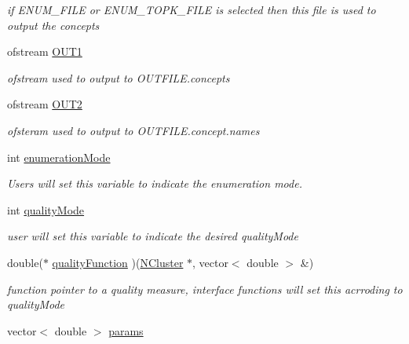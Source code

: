 \begin{DoxyCompactItemize}
\begin{DoxyCompactList}\small\item\em if ENUM\_\-FILE or ENUM\_\-TOPK\_\-FILE is selected then this file is used to output the concepts \item\end{DoxyCompactList}\item 
ofstream \hyperlink{class_lattice_algos_a5e06ea8a8e76d5b6019481e778655a5c}{OUT1}
\begin{DoxyCompactList}\small\item\em ofstream used to output to OUTFILE.concepts \item\end{DoxyCompactList}\item 
ofstream \hyperlink{class_lattice_algos_ad6ee83e69ef859717cbc747edf4fc306}{OUT2}
\begin{DoxyCompactList}\small\item\em ofsteram used to output to OUTFILE.concept.names \item\end{DoxyCompactList}\item 
int \hyperlink{class_lattice_algos_a03adc61166377c993b4d1ef8f8ee12ee}{enumerationMode}
\begin{DoxyCompactList}\small\item\em Users will set this variable to indicate the enumeration mode. \item\end{DoxyCompactList}\item 
int \hyperlink{class_lattice_algos_aabdafd3fa45b3ed1d773b313e3a60e17}{qualityMode}
\begin{DoxyCompactList}\small\item\em user will set this variable to indicate the desired qualityMode \item\end{DoxyCompactList}\item 
double($\ast$ \hyperlink{class_lattice_algos_ae25f31284b5956278f390d0edc412ef8}{qualityFunction} )(\hyperlink{class_n_cluster}{NCluster} $\ast$, vector$<$ double $>$ \&)
\begin{DoxyCompactList}\small\item\em function pointer to a quality measure, interface functions will set this acrroding to qualityMode \item\end{DoxyCompactList}\item 
vector$<$ double $>$ \hyperlink{class_lattice_algos_a84a7c48411084ff5d792af41e57ce96a}{params}

\end{DoxyCompactItemize}
